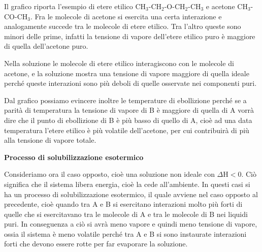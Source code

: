 \vspace{0.2cm}Il grafico riporta l'esempio di etere etilico CH$_3$-CH$_2$-O-CH$_2$-CH$_3$ e acetone CH$_3$-CO-CH$_3$. Fra le molecole di acetone si esercita una certa interazione e analogamente succede tra le molecole di etere etilico. Tra l'altro queste sono minori delle prime, infatti la tensione di vapore dell'etere etilico puro è maggiore di quella dell'acetone puro.

Nella soluzione le molecole di etere etilico interagiscono con le molecole di acetone, e la soluzione mostra una tensione di vapore maggiore di quella ideale perché queste interazioni sono più deboli di quelle osservate nei componenti puri.

Dal grafico possiamo evincere inoltre le temperature di ebollizione perché se a parità di temperatura la tensione di vapore di B è maggiore di quella di A vorrà dire che il punto di ebollizione di B è più basso di quello di A, cioè ad una data temperatura l'etere etilico è più volatile dell'acetone, per cui contribuirà di più alla tensione di vapore totale.

\vspace{0.2cm}\textbf{Processo di solubilizzazione esotermico}

Consideriamo ora il caso opposto, cioè una soluzione non ideale con $\Delta$H$<$0. Ciò significa che il sistema libera energia, cioè la cede all'ambiente. In questi casi si ha un processo di solubilizzazione esotermico, il quale avviene nel caso opposto al precedente, cioè quando tra A e B si esercitano interazioni molto più forti di quelle che si esercitavano tra le molecole di A e tra le molecole di B nei liquidi puri. In conseguenza a ciò si avrà meno vapore e quindi meno tensione di vapore, ossia il sistema è meno volatile perché tra A e B si sono instaurate interazioni forti che devono essere rotte per far evaporare la soluzione.

